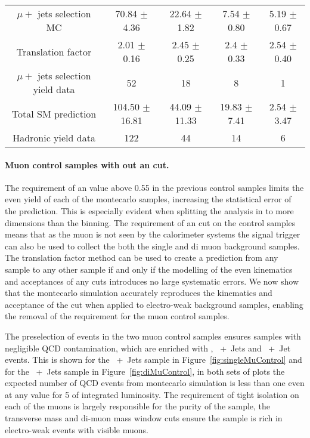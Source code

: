 \begin{table}[|h]
\begin{tabular}{ |c|c|c|c|c| }
$\mu +$ jets selection MC         & 70.84  $\pm$  4.36     & 22.64  $\pm$  1.82     & 7.54  $\pm$  0.80     & 5.19  $\pm$  0.67    \\ 
Translation factor                & 2.01  $\pm$  0.16      & 2.45  $\pm$  0.25      & 2.4  $\pm$  0.33     & 2.54  $\pm$  0.40    \\ 
$\mu +$ jets selection yield data & 52                     & 18                     & 8                     & 1                    \\ 
Total SM prediction               & 104.50  $\pm$  16.81   & 44.09  $\pm$  11.33    & 19.83  $\pm$  7.41    & 2.54  $\pm$  3.47    \\ 
Hadronic yield data               & 122                    & 44                     & 14                    & 6                    \\ 
\hline

\end{tabular}
\end{table}

\paragraph{Muon control samples with out an \alt cut.} %
\label{par:muon_control_samples_with_out_an_alt_cut_}
  
The requirement of an \alt value above 0.55 in the previous control samples 
limits the even yield of each of the montecarlo samples, increasing the 
statistical error of the prediction. This is especially evident when splitting 
the analysis in to more dimensions than the \HT binning. The requirement of an 
\alt cut on the control samples means that as the muon is not seen by the 
calorimeter systems the signal trigger can also be used to collect the both the 
single and di muon background samples.
The translation factor method can be used to create a prediction from any 
sample to any other sample if and only if the modelling of the even kinematics 
and acceptances of any cuts introduces no large systematic errors. We now show 
that the montecarlo simulation accurately reproduces the kinematics and 
acceptance of the \alt cut when applied to electro-weak background samples, 
enabling the removal of the \alt requirement for the muon control samples.


The preselection of events in the two muon control samples ensures samples 
with negligible QCD contamination, which are enriched with 
\HepProcess{\Ptop\APtop}, \PW~+~Jets and \PZ~+~Jet events. This is shown for 
the \Pmuon~+~Jets sample in Figure~\ref{fig:singleMuControl} and for the 
\HepProcess{\Pmuon\APmuon}~+~Jets sample in Figure~\ref{fig:diMuControl}, in 
both sets of plots the expected number of QCD events from montecarlo simulation 
is less than one even at any \alt value for \unit{5}{\invfb} of integrated 
luminosity. The requirement of tight isolation on each of the muons is largely 
responsible for the purity of the sample, the transverse mass and di-muon mass 
window cuts ensure the sample is rich in electro-weak events with visible muons.


